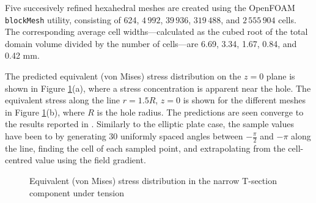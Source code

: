 \documentclass[sn-mathphys,Numbered]{sn-jnl}%
\begin{document}
Five succesively refined hexahedral meshes are created using the OpenFOAM \texttt{blockMesh} utility, consisting of 624, $4\,992$, $39\,936$, $319\,488$, and $2\,555\,904$ cells.
The corresponding average cell widths—calculated as the cubed root of the total domain volume divided by the number of cells—are 6.69, 3.34, 1.67, 0.84, and 0.42 mm.


The predicted equivalent (von Mises) stress distribution on the $z = 0$ plane is shown in Figure \ref{fig:narrowTmember_sigmaEq}(a), where a stress concentration is apparent near the hole.
The equivalent stress along the line $r = 1.5R$, $z = 0$ is shown for the different meshes in Figure \ref{fig:narrowTmember_sigmaEq}(b), where $R$ is the hole radius.
The predictions are seen converge to the results reported in \citet{Demirdzic1997a}.
Similarly to the elliptic plate case, the sample values have been to by generating 30 uniformly spaced angles between $-\frac{\pi}{2}$ and $-\pi$ along the line, finding the cell of each sampled point, and extrapolating from the cell-centred value using the field gradient.
\begin{figure}[htbp]
   \centering
   \caption{Equivalent (von Mises) stress distribution in the narrow T-section component under tension}
   \label{fig:narrowTmember_sigmaEq}
\end{figure}
\end{document}
